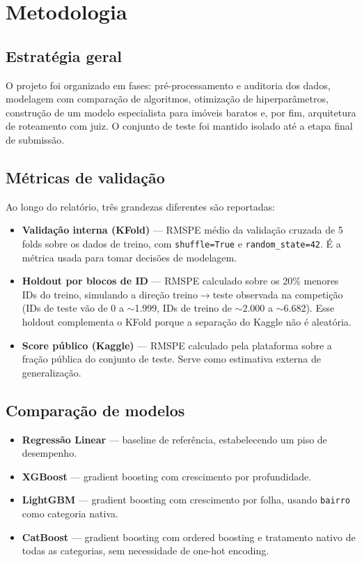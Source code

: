 \documentclass[12pt,a4paper]{article}
\begin{document}
\section{Metodologia}

\subsection{Estratégia geral}

O projeto foi organizado em fases: pré-processamento e auditoria dos dados, modelagem com comparação de algoritmos, otimização de hiperparâmetros, construção de um modelo especialista para imóveis baratos e, por fim, arquitetura de roteamento com juiz. O conjunto de teste foi mantido isolado até a etapa final de submissão.

\subsection{Métricas de validação}

Ao longo do relatório, três grandezas diferentes são reportadas:

\begin{itemize}
  \item \textbf{Validação interna (KFold)} --- RMSPE médio da validação cruzada de 5 folds sobre os dados de treino, com \lstinline{shuffle=True} e \lstinline{random_state=42}. É a métrica usada para tomar decisões de modelagem.
  \item \textbf{Holdout por blocos de ID} --- RMSPE calculado sobre os 20\% menores IDs do treino, simulando a direção treino$\to$teste observada na competição (IDs de teste vão de 0 a $\sim$1.999, IDs de treino de $\sim$2.000 a $\sim$6.682). Esse holdout complementa o KFold porque a separação do Kaggle não é aleatória.
  \item \textbf{Score público (Kaggle)} --- RMSPE calculado pela plataforma sobre a fração pública do conjunto de teste. Serve como estimativa externa de generalização.
\end{itemize}

\subsection{Comparação de modelos}

\begin{itemize}
  \item \textbf{Regressão Linear} --- baseline de referência, estabelecendo um piso de desempenho.
  \item \textbf{XGBoost} --- gradient boosting com crescimento por profundidade.
  \item \textbf{LightGBM} --- gradient boosting com crescimento por folha, usando \texttt{bairro} como categoria nativa.
  \item \textbf{CatBoost} --- gradient boosting com ordered boosting e tratamento nativo de todas as categorias, sem necessidade de one-hot encoding.
\end{itemize}
\end{document}
